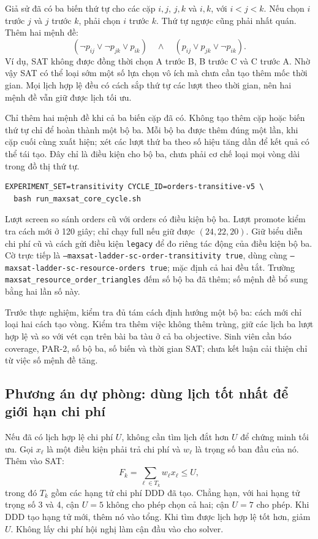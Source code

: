 \documentclass[11pt,a4paper]{article}
\newcommand{\code}[1]{\texttt{#1}}
\begin{document}
Giả sử đã có ba biến thứ tự cho các cặp $i,j$, $j,k$ và $i,k$, với
$i<j<k$. Nếu chọn $i$ trước $j$ và $j$ trước $k$, phải chọn $i$ trước $k$.
Thứ tự ngược cũng phải nhất quán. Thêm hai mệnh đề:
\[
(\neg p_{ij}\lor\neg p_{jk}\lor p_{ik})
\quad\land\quad
(p_{ij}\lor p_{jk}\lor\neg p_{ik}).
\]
Ví dụ, SAT không được đồng thời chọn A trước B, B trước C và C trước A.
Nhờ vậy SAT có thể loại sớm một số lựa chọn vô ích mà chưa cần tạo thêm
mốc thời gian. Mọi lịch hợp lệ đều có cách sắp thứ tự các lượt theo thời
gian, nên hai mệnh đề vẫn giữ được lịch tối ưu.

Chỉ thêm hai mệnh đề khi cả ba biến cặp đã có. Không tạo thêm cặp hoặc biến
thứ tự chỉ để hoàn thành một bộ ba. Mỗi bộ ba được thêm đúng một lần, khi
cặp cuối cùng xuất hiện; xét các lượt thứ ba theo số hiệu tăng dần để kết
quả có thể tái tạo. Đây chỉ là điều kiện cho bộ ba, chưa phải cơ chế loại
mọi vòng dài trong đồ thị thứ tự.

\begin{verbatim}
EXPERIMENT_SET=transitivity CYCLE_ID=orders-transitive-v5 \
  bash run_maxsat_core_cycle.sh
\end{verbatim}

Lượt screen so sánh orders cũ với orders có điều kiện bộ ba. Lượt promote
kiểm tra cách mới ở 120 giây; chỉ chạy full nếu giữ được $(24,22,20)$.
Giữ biểu diễn chi phí cũ và cách gửi điều kiện \code{legacy} để đo riêng
tác động của điều kiện bộ ba. Cờ trực tiếp là
\code{--maxsat-ladder-sc-order-transitivity true}, dùng cùng
\code{--maxsat-ladder-sc-resource-orders true}; mặc định cả hai đều tắt.
Trường \code{maxsat\_resource\_order\_triangles} đếm số bộ ba đã thêm;
số mệnh đề bổ sung bằng hai lần số này.

Trước thực nghiệm, kiểm tra đủ tám cách định hướng một bộ ba: cách mới chỉ
loại hai cách tạo vòng. Kiểm tra thêm việc không thêm trùng, giữ các lịch
ba lượt hợp lệ và so với vét cạn trên bài ba tàu ở cả ba objective.
Sinh viên cần báo coverage, PAR-2, số bộ ba, số biến và thời gian SAT;
chưa kết luận cải thiện chỉ từ việc số mệnh đề tăng.

\subsection{Phương án dự phòng: dùng lịch tốt nhất để giới hạn chi phí}

Nếu đã có lịch hợp lệ chi phí $U$, không cần tìm lịch đắt hơn $U$ để chứng
minh tối ưu. Gọi $x_\ell$ là một điều kiện phải trả chi phí và $w_\ell$ là
trọng số ban đầu của nó. Thêm vào SAT:
\[
F_k=\sum_{\ell\in T_k} w_\ell x_\ell\le U,
\]
trong đó $T_k$ gồm các hạng tử chi phí DDD đã tạo. Chẳng hạn, với hai hạng
tử trọng số 3 và 4, cận $U=5$ không cho phép chọn cả hai; cận $U=7$ cho phép.
Khi DDD tạo hạng tử mới, thêm nó vào tổng. Khi tìm được lịch hợp lệ tốt hơn,
giảm $U$. Không lấy chi phí hội nghị làm cận đầu vào cho solver.
\end{document}

